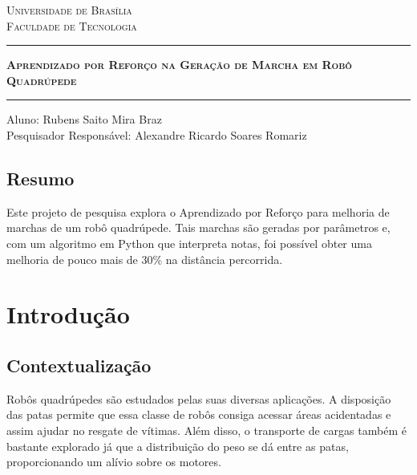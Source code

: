 \documentclass[12pt]{report}
\begin{document}
\begin{center}
    \vspace*{-3cm}
    \textsc{Universidade de Brasília} \\
    \textsc{Faculdade de Tecnologia}
    
    \vspace{1cm}
    \rule{411pt}{1.3pt}
    \vspace{0.2cm}
    
    \Large \textbf{\textsc{Aprendizado por Reforço na Geração de Marcha em Robô Quadrúpede}}
    
    \rule{411pt}{1.3pt}
    \vspace{1cm}
    
    Aluno: Rubens Saito Mira Braz\\
    \vspace{0.5cm}
    Pesquisador Responsável: Alexandre Ricardo Soares Romariz
    
    \vspace{1cm}
\end{center}


\vspace*{-0.5cm}
\section*{Resumo}

Este projeto de pesquisa explora o Aprendizado por Reforço para melhoria de marchas de um robô quadrúpede. Tais marchas são geradas por parâmetros e, com um algoritmo em Python que interpreta notas, foi possível obter uma melhoria de pouco mais de 30\% na distância percorrida.


\vspace*{-0.6cm}
\chapter*{Introdução}

\vspace*{-0.75cm}
\section*{Contextualização}

Robôs quadrúpedes são estudados pelas suas diversas aplicações. A disposição das patas permite que essa classe de robôs consiga acessar áreas acidentadas e assim ajudar no resgate de vítimas. Além disso, o transporte de cargas também é bastante explorado já que a distribuição do peso se dá entre as patas, proporcionando um alívio sobre os motores.
\end{document}
